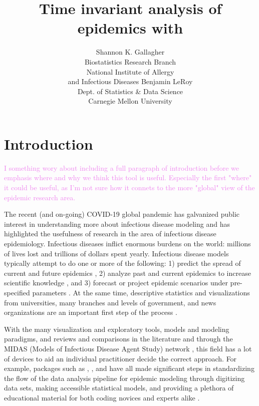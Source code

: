 \documentclass[
  shortnames]{jss}
\author{
Shannon K. Gallagher\\Biostatistics Research Branch\\
National Institute of Allergy\\
and Infectious Diseases \And Benjamin LeRoy\\Dept. of Statistics \& Data
Science\\
Carnegie Mellon University
}
\title{Time invariant analysis of epidemics with \pkg{EpiCompare}}
\begin{document}
\newcommand{\shannon}[1]{\textcolor{orange}{#1}}
\newcommand{\ben}[1]{\textcolor{violet}{#1}}

\newtheorem{theorem}{Theorem}

\section[Intro]{Introduction}\label{sec:intro}

\textcolor{violet}{I something wory about including a full paragraph of introduction before we emphasis where and why we think this tool is useful. Especially the first "where" it could be useful, as I'm not sure how it connets to the more "global" view of the epidemic research area.}

The recent (and on-going) COVID-19 global pandemic has galvanized public
interest in understanding more about infectious disease modeling and has
highlighted the usefulness of research in the area of infectious disease
epidemiology. Infectious diseases inflict enormous burdens on the world:
millions of lives lost and trillions of dollars spent yearly. Infectious
disease models typically attempt to do one or more of the following: 1)
predict the spread of current and future epidemics
\citep[e.g. flu prediction][]{Biggerstaff2016}, 2) analyze past and
current epidemics to increase scientific knowledge
\citep[e.g. historical measle outbreaks][]{Neal2004}, and 3) forecast or
project epidemic scenarios under pre-specified parameters
\citep[e.g.][]{ferguson2020}. At the same time, descriptive statistics
and visualizations from universities, many branches and levels of
government, and news organizations are an important first step of the
process \citep{dong2020,cdc-covid-tracker2021,wp-covid-tracker2021} .

With the many visualization and exploratory tools, models and modeling
paradigms, and reviews and comparisons in the literature and through the
MIDAS (Models of Infectious Disease Agent Study) network
\citep{midasnetwork2021}, this field has a lot of devices to aid an
individual practitioner decide the correct approach. For
example, packages such as ,
, and  have all made significant steps in
standardizing the flow of the data analysis pipeline for epidemic
modeling through digitizing data sets, making accessible statistical
models, and providing a plethora of educational material for both coding
novices and experts alike \citep{surveillance2017,Jenness2018,King2016}.
\end{document}
